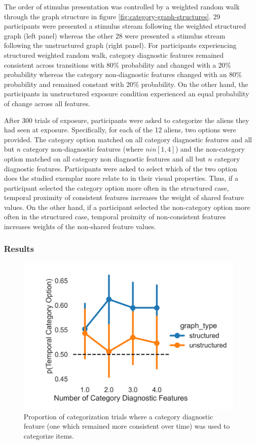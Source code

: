 The order of stimulus presentation was controlled by a weighted random walk through the graph structure in figure \ref{fig:category-graph-structures}. 29 participants were presented a stimulus stream following the weighted structured graph (left panel) whereas the other 28 were presented a stimulus stream following the unstructured graph (right panel). For participants experiencing structured weighted random walk, category diagnostic features remained consistent across transitions with 80\% probability and changed with a 20\% probability whereas the category non-diagnostic features changed with an 80\% probability and remained constant with 20\% probability. On the other hand, the participants in unstructured exposure condition experienced an equal probability of change across all features. 

After 300 trials of exposure, participants were asked to categorize the aliens they had seen at exposure. Specifically, for each of the 12 aliens, two options were provided. The category option matched on all category diagnostic features and all but $n$ category non-diagnostic features (where $n in [1,4]$) and the non-category option matched on all category non diagnostic features and all but $n$ category diagnostic features. Participants were asked to select which of the two option does the studied exemplar more relate to in their visual properties. Thus, if a participant selected the category option more often in the structured case, temporal proximity of consistent features increases the weight of shared feature values. On the other hand, if a participant selected the non-category option more often in the structured case, temporal proimity of non-consistent features increases weights of the non-shared feature values.

\subsubsection*{Results}

\begin{figure}[h]
    \centering
    \label{fig:exp4a-choice-accuracy}
    \caption{Proportion of categorization trials where a category diagnostic feature (one which remained more consistent over time) was used to categorize items.}
    \includegraphics[width = \textwidth]{chapter_notebooks/chapter_4/figures/exp4_proportion_results.png}
\end{figure}


